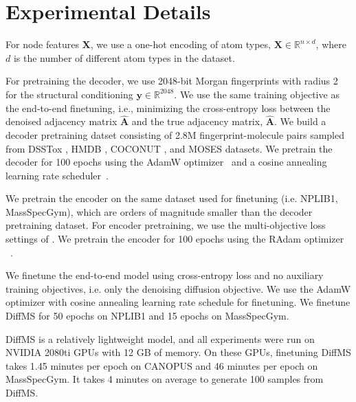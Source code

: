 \documentclass{article}
\theoremstyle{plain}
\theoremstyle{definition}
\theoremstyle{remark}
\begin{document}
\section{Experimental Details} \label{appendix:exp_details}

For node features $\mathbf{X}$, we use a one-hot encoding of atom types, $\mathbf{X} \in \mathbb{R}^{n \times d}$, where $d$ is the number of different atom types in the dataset.

For pretraining the decoder, we use 2048-bit Morgan fingerprints with radius 2 for the structural conditioning $\mathbf{y}\in\mathbb{R}^{2048}$. We use the same training objective as the end-to-end finetuning, i.e., minimizing the cross-entropy loss between the denoised adjacency matrix $\mathbf{\hat{A}}$ and the true adjacency matrix, $\mathbf{\hat{A}}$. We build a decoder pretraining datset consisting of 2.8M fingerprint-molecule pairs sampled from  DSSTox \citep{CCTE2019}, HMDB \citep{hmdb}, COCONUT \citep{Sorokina_Merseburger_Rajan_Yirik_Steinbeck_2021}, and MOSES \citep{polykovskiy2020molecularsetsmosesbenchmarking} datasets. We pretrain the decoder for 100 epochs using the AdamW optimizer~\citep{loshchilov2017sgdrstochasticgradientdescent} and a cosine annealing learning rate scheduler~\citep{loshchilov2019decoupledweightdecayregularization}.

We pretrain the encoder on the same dataset used for finetuning (i.e. NPLIB1, MassSpecGym), which are orders of magnitude smaller than the decoder pretraining dataset. For encoder pretraining, we use the multi-objective loss settings of \citet{goldman2023mist}. We pretrain the encoder for 100 epochs using the RAdam optimizer ~\citep{liu2021varianceadaptivelearningrate}.

We finetune the end-to-end model using cross-entropy loss and no auxiliary training objectives, i.e. only the denoising diffusion objective. We use the AdamW optimizer with cosine annealing learning rate schedule for finetuning. We finetune DiffMS for 50 epochs on NPLIB1 and 15 epochs on MassSpecGym.

DiffMS is a relatively lightweight model, and all experiments were run on NVIDIA 2080ti GPUs with 12 GB of memory. On these GPUs, finetuning DiffMS takes 1.45 minutes per epoch on CANOPUS and 46 minutes per epoch on MassSpecGym. It takes 4 minutes on average to generate 100 samples from DiffMS.
\end{document}
